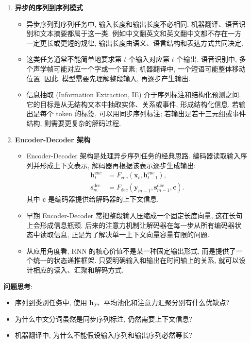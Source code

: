 \documentclass{../nndlcourse}
\begin{document}
\begin{enumerate}
\item \textbf{异步的序列到序列模式}
  \begin{itemize}
    \item 异步序列到序列任务中, 输入长度和输出长度不必相同. 机器翻译、语音识别和文本摘要都属于这一类. 例如中文翻英文和英文翻中文都不存在一方一定更长或更短的规律, 输出长度由语义、语言结构和表达方式共同决定.
    \item 这类任务通常不能简单地要求第 $t$ 个输入对应第 $t$ 个输出. 语音识别中, 多个声学帧可能对应一个字或一个音素; 机器翻译中, 一个短语可能整体移动位置. 因此, 模型需要先理解整段输入, 再逐步产生输出.
    \item 信息抽取 (Information Extraction, IE) 介于序列标注和结构化预测之间. 它的目标是从无结构文本中抽取实体、关系或事件, 形成结构化信息. 若输出是每个 token 的标签, 可以用同步序列标注; 若输出是若干三元组或事件结构, 则需要更复杂的解码过程.
  \end{itemize}

\item \textbf{Encoder-Decoder 架构}
  \begin{itemize}
    \item Encoder-Decoder 架构是处理异步序列任务的经典思路. 编码器读取输入序列并形成上下文表示, 解码器再根据该表示逐步生成输出:
    \begin{align*}
      \boldsymbol{h}_t^{\mathrm{enc}} &= F_{\mathrm{enc}}\left(\boldsymbol{x}_t,\boldsymbol{h}_{t-1}^{\mathrm{enc}}\right), \\
      \boldsymbol{s}_m^{\mathrm{dec}} &= F_{\mathrm{dec}}\left(\boldsymbol{y}_{m-1},\boldsymbol{s}_{m-1}^{\mathrm{dec}},\boldsymbol{c}\right).
    \end{align*}
    其中 $\boldsymbol{c}$ 是编码器提供给解码器的上下文信息.
    \item 早期 Encoder-Decoder 常把整段输入压缩成一个固定长度向量, 这在长句上会形成信息瓶颈. 后来的注意力机制让解码器在每一步从所有编码器状态中读取信息, 正是为了解决单一上下文向量容量有限的问题.
    \item 从应用角度看, RNN 的核心价值不是某一种固定输出形式, 而是提供了一个统一的状态递推框架. 只要明确输入和输出在时间轴上的关系, 就可以设计相应的读入、汇聚和解码方式.
  \end{itemize}
\end{enumerate}

\textbf{问题思考}:
\begin{itemize}
  \item 序列到类别任务中, 使用 $\boldsymbol{h}_T$、平均池化和注意力汇聚分别有什么优缺点?
  \item 为什么中文分词虽然是同步序列标注, 仍然需要上下文信息?
  \item 机器翻译中, 为什么不能假设输入序列和输出序列必然等长?
\end{itemize}
\end{document}
